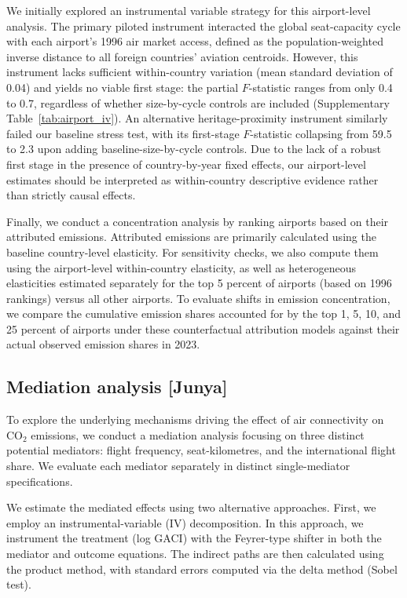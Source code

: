 \documentclass[12pt]{extarticle}
\begin{document}
We initially explored an instrumental variable strategy for this airport-level analysis. The primary piloted instrument interacted the global seat-capacity cycle with each airport's 1996 air market access, defined as the population-weighted inverse distance to all foreign countries' aviation centroids. However, this instrument lacks sufficient within-country variation (mean standard deviation of 0.04) and yields no viable first stage: the partial $F$-statistic ranges from only 0.4 to 0.7, regardless of whether size-by-cycle controls are included (Supplementary Table~\ref{tab:airport_iv}). An alternative heritage-proximity instrument similarly failed our baseline stress test, with its first-stage $F$-statistic collapsing from 59.5 to 2.3 upon adding baseline-size-by-cycle controls. Due to the lack of a robust first stage in the presence of country-by-year fixed effects, our airport-level estimates should be interpreted as within-country descriptive evidence rather than strictly causal effects.

Finally, we conduct a concentration analysis by ranking airports based on their attributed emissions. Attributed emissions are primarily calculated using the baseline country-level elasticity. For sensitivity checks, we also compute them using the airport-level within-country elasticity, as well as heterogeneous elasticities estimated separately for the top 5 percent of airports (based on 1996 rankings) versus all other airports. To evaluate shifts in emission concentration, we compare the cumulative emission shares accounted for by the top 1, 5, 10, and 25 percent of airports under these counterfactual attribution models against their actual observed emission shares in 2023.


\subsection*{Mediation analysis [Junya]}

To explore the underlying mechanisms driving the effect of air connectivity on CO$_2$ emissions, we conduct a mediation analysis focusing on three distinct potential mediators: flight frequency, seat-kilometres, and the international flight share. We evaluate each mediator separately in distinct single-mediator specifications.

We estimate the mediated effects using two alternative approaches. First, we employ an instrumental-variable (IV) decomposition. In this approach, we instrument the treatment (log GACI) with the Feyrer-type shifter in both the mediator and outcome equations. The indirect paths are then calculated using the product method, with standard errors computed via the delta method (Sobel test). 
\end{document}
